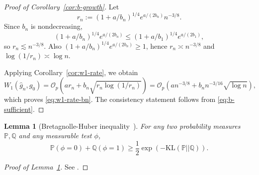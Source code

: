 \documentclass[english, 11pt]{article}
\theoremstyle{plain}
\newtheorem{lemma}[theorem]{Lemma}
\theoremstyle{definition}
\theoremstyle{remark}
\begin{document}
\begin{appendix}
\restategrowthcondition*

\begin{proof}[Proof of Corollary~\ref{cor:b-growth}]
Let
\begin{equation*}
r_n:=(1+a/b_n)^{1/4}e^{a/(2b_n)}n^{-3/8}.
\end{equation*}
Since $b_n$ is nondecreasing,
\begin{equation*}
(1+a/b_n)^{1/4}e^{a/(2b_n)}\le(1+a/b_1)^{1/4}e^{a/(2b_1)},
\end{equation*}
so $r_n\lesssim n^{-3/8}$. Also $(1+a/b_n)^{1/4}e^{a/(2b_n)}\ge 1$, hence $r_n\asymp n^{-3/8}$ and $\log(1/r_n)\asymp \log n$.

Applying Corollary~\ref{cor:w1-rate}, we obtain
\begin{equation*}
W_1(\widehat g_n,g_0) = \mathcal O_p\left( a r_n+b_n\sqrt{r_n\log(1/r_n)} \right)
= \mathcal O_p \left( a n^{-3/8} + b_n n^{-3/16}\sqrt{\log n} \right),
\end{equation*}
which proves \eqref{eq:w1-rate-bn}. The consistency statement follows from \eqref{eq:b-sufficient}.
\end{proof}

\begin{lemma}[Bretagnolle-Huber inequality~\cite{bretagnolle2006estimation,lattimore2020bandit}]\label{lem:BH}
For any two probability measures $\mathbb P,\mathbb Q$ and any measurable test $\phi$,
\begin{equation*}
\mathbb P(\phi=0)+\mathbb Q(\phi=1) \ge
\frac12\exp \left(-\mathrm{KL}(\mathbb P || \mathbb Q)\right).
\end{equation*}
\end{lemma}

\begin{proof}[Proof of Lemma~\ref{lem:BH}]
See \cite[Theorem 14.2]{lattimore2020bandit}.
\end{proof}

\restateimpossibility*


\end{appendix}
\end{document}
